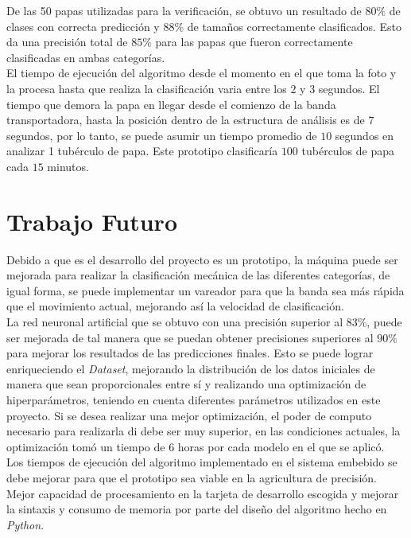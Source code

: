 	
	De las 50 papas utilizadas para la verificación, se obtuvo un resultado de $80\%$ de clases con correcta predicción y $88\%$ de tamaños correctamente clasificados. Esto da una precisión total de $85\%$ para las papas que fueron correctamente clasificadas en ambas categorías.\\
	
	El tiempo de ejecución del algoritmo desde el momento en el que toma la foto y la procesa hasta que realiza la clasificación varia entre los $2$ y $3$ segundos. El tiempo que demora la papa en llegar desde el comienzo de la banda transportadora, hasta la posición dentro de la estructura de análisis es de $7$ segundos, por lo tanto, se puede asumir un tiempo promedio de $10$ segundos en analizar 1 tubérculo de papa. Este prototipo clasificaría $100$ tubérculos de papa cada $15$ minutos.	 	

	\chapter{Trabajo Futuro}

	Debido a que es el desarrollo del proyecto es un prototipo, la máquina puede ser mejorada para realizar la clasificación mecánica de las diferentes categorías, de igual forma, se puede implementar un vareador para que la banda sea más rápida que el movimiento actual, mejorando así la velocidad de clasificación.\\
	
	La red neuronal artificial que se obtuvo con una precisión superior al $83\%$, puede ser mejorada de tal manera que se puedan obtener precisiones superiores al $90\%$ para mejorar los resultados de las predicciones finales. Esto se puede lograr enriqueciendo el \textit{Dataset}, mejorando la distribución de los datos iniciales de manera que sean proporcionales entre sí y realizando una optimización de hiperparámetros, teniendo en cuenta diferentes parámetros utilizados en este proyecto. Si se desea realizar una mejor optimización, el poder de computo necesario para realizarla di debe ser muy superior, en las condiciones actuales, la optimización tomó un tiempo de $6$ horas por cada modelo en el que se aplicó.\\
	
	Los tiempos de ejecución del algoritmo implementado en el sistema embebido se debe mejorar para que el prototipo sea viable en la agricultura de precisión. Mejor capacidad de procesamiento en la tarjeta de desarrollo escogida y mejorar la sintaxis y consumo de memoria por parte del diseño del algoritmo hecho en \textit{Python}.
	
	
	
	
	





